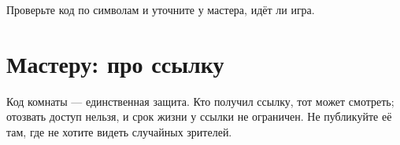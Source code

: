 Проверьте код по символам и уточните у мастера, идёт ли игра.

\section{Мастеру: про ссылку}
\label{sec:observer:for-master}

Код комнаты --- единственная защита. Кто получил ссылку, тот может смотреть; отозвать доступ нельзя, и срок жизни у ссылки не ограничен. Не публикуйте её там, где не хотите видеть случайных зрителей.
